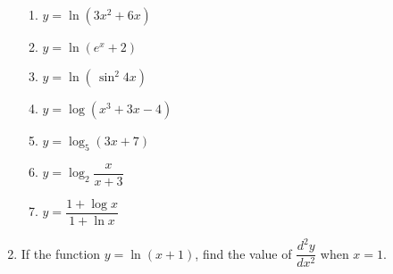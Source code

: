 \documentclass[12pt]{report}
\begin{document}
\begin{enumerate}
\begin{enumerate}
          \item $y=\ln\left(3x^{2}+6x\right)$
          \item $y=\ln\left(e^{x}+2\right)$
          \item $y=\ln\left(\,\sin^{2}4x\right)$
          \item $y=\log\left(x^{3}+3x-4\right)$
          \item $y=\log_{5}\left(3x+7\right)$
          \item $y=\log_{2}{\dfrac{x}{x+3}}$
          \item $y={\dfrac{1+\log x}{1+\ln x}}$
        \end{enumerate}
  \item If the function $y = \ln(x+1)$, find the value of $\dfrac{d^2y}{dx^2}$ when $x
          = 1$.
\end{enumerate}
\end{document}
